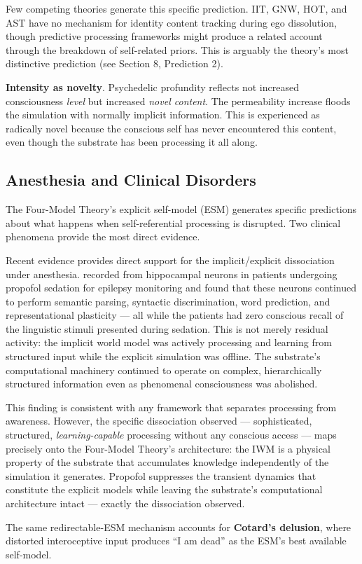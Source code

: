 \documentclass[12pt]{article}
\newcommand{\revstart}{}
\newcommand{\revend}{}
\begin{document}
Few competing theories generate this specific prediction. IIT, GNW, HOT, and AST have no mechanism for identity content tracking during ego dissolution, though predictive processing frameworks might produce a related account through the breakdown of self-related priors. This is arguably the theory's most distinctive prediction (see Section 8, Prediction 2).

\textbf{Intensity as novelty}. Psychedelic profundity reflects not increased consciousness \emph{level} but increased \emph{novel content}. The permeability increase floods the simulation with normally implicit information. This is experienced as radically novel because the conscious self has never encountered this content, even though the substrate has been processing it all along.


\subsection{Anesthesia and Clinical Disorders}


{\revstart The Four-Model Theory's explicit self-model (ESM) generates specific predictions about what happens when self-referential processing is disrupted. Two clinical phenomena provide the most direct evidence.

Recent evidence provides direct support for the implicit/explicit dissociation under anesthesia. \citet{Katlowitz2026} recorded from hippocampal neurons in patients undergoing propofol sedation for epilepsy monitoring and found that these neurons continued to perform semantic parsing, syntactic discrimination, word prediction, and representational plasticity --- all while the patients had zero conscious recall of the linguistic stimuli presented during sedation. This is not merely residual activity: the implicit world model was actively processing and learning from structured input while the explicit simulation was offline. The substrate's computational machinery continued to operate on complex, hierarchically structured information even as phenomenal consciousness was abolished.

This finding is consistent with any framework that separates processing from awareness. However, the specific dissociation observed --- sophisticated, structured, \emph{learning-capable} processing without any conscious access --- maps precisely onto the Four-Model Theory's architecture: the IWM is a physical property of the substrate that accumulates knowledge independently of the simulation it generates. Propofol suppresses the transient dynamics that constitute the explicit models while leaving the substrate's computational architecture intact --- exactly the dissociation \citet{Katlowitz2026} observed.

The same redirectable-ESM mechanism accounts for \textbf{Cotard's delusion}, where distorted interoceptive input produces ``I am dead'' as the ESM's best available self-model.\revend}
\end{document}
